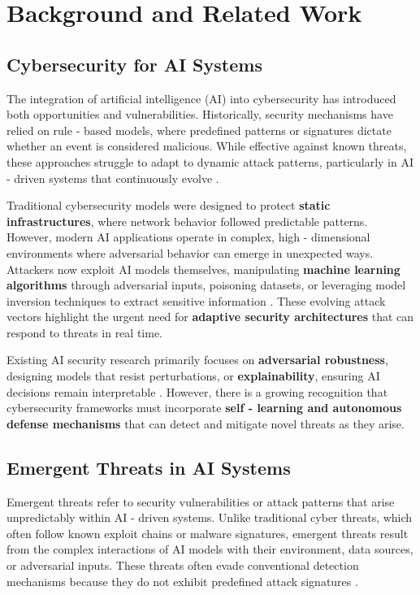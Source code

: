 \section{Background and Related Work}
\subsection{Cybersecurity for AI Systems}
The integration of artificial intelligence (AI) into cybersecurity has introduced both opportunities and vulnerabilities. Historically, security mechanisms have relied on rule - based models, where predefined patterns or signatures dictate whether an event is considered malicious. While effective against known threats, these approaches struggle to adapt to dynamic attack patterns, particularly in AI - driven systems that continuously evolve \cite{tramer2017ensemble}.

Traditional cybersecurity models were designed to protect \textbf{static infrastructures}, where network behavior followed predictable patterns. However, modern AI applications operate in complex, high - dimensional environments where adversarial behavior can emerge in unexpected ways. Attackers now exploit AI models themselves, manipulating \textbf{machine learning algorithms} through adversarial inputs, poisoning datasets, or leveraging model inversion techniques to extract sensitive information \cite{sharif2016accessorize}. These evolving attack vectors highlight the urgent need for \textbf{adaptive security architectures} that can respond to threats in real time.

Existing AI security research primarily focuses on \textbf{adversarial robustness}, designing models that resist perturbations, or \textbf{explainability}, ensuring AI decisions remain interpretable \cite{goodfellow2014explaining, papernot2016limitations}. However, there is a growing recognition that cybersecurity frameworks must incorporate \textbf{self - learning and autonomous defense mechanisms} that can detect and mitigate novel threats as they arise.

\subsection{Emergent Threats in AI Systems}
Emergent threats refer to security vulnerabilities or attack patterns that arise unpredictably within AI - driven systems. Unlike traditional cyber threats, which often follow known exploit chains or malware signatures, emergent threats result from the complex interactions of AI models with their environment, data sources, or adversarial inputs. These threats often evade conventional detection mechanisms because they do not exhibit predefined attack signatures \cite{biggio2013evasion}.


